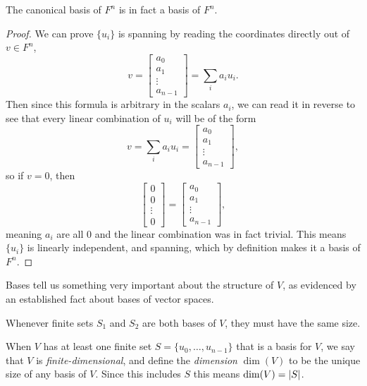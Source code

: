 \begin{prop}
	The canonical basis of $F^n$ is in fact a basis of $F^n$.
\end{prop}
\begin{proof}
	We can prove $\{u_i\}$ is spanning by reading the coordinates directly out of $v \in F^n$,
	\[v = \begin{bmatrix}
		a_0 \\ a_1 \\ \vdots \\ a_{n-1}
	\end{bmatrix} = \sum_i a_i u_i.\]
	Then since this formula is arbitrary in the scalars $a_i$, we can read it in reverse to see that every linear combination of $u_i$ will be of the form
	\[v = \sum_i a_i u_i = \begin{bmatrix}
		a_0 \\ a_1 \\ \vdots \\ a_{n-1}
	\end{bmatrix},\]
	so if $v = 0$, then
	\[\begin{bmatrix}
		0 \\ 0 \\ \vdots \\ 0
	\end{bmatrix} = \begin{bmatrix}
		a_0 \\ a_1 \\ \vdots \\ a_{n-1}
	\end{bmatrix},\]
	meaning $a_i$ are all 0 and the linear combination was in fact trivial. This means $\{u_i\}$ is linearly independent, and spanning, which by definition makes it a basis of $F^n$.
\end{proof}

Bases tell us something very important about the structure of $V$, as evidenced by an established fact about bases of vector spaces.
\begin{prop}
	Whenever finite sets $S_1$ and $S_2$ are both bases of $V$, they must have the same size.
\end{prop}

\begin{define}
	When $V$ has at least one finite set $S = \{u_0,\dots,u_{n-1}\}$ that is a basis for $V$, we say that $V$ is \emph{finite-dimensional}, and define the \emph{dimension} $\dim(V)$ to be the unique size of any basis of $V$. Since this includes $S$ this means $\dim(V) = \left| S \right|$.
\end{define}

